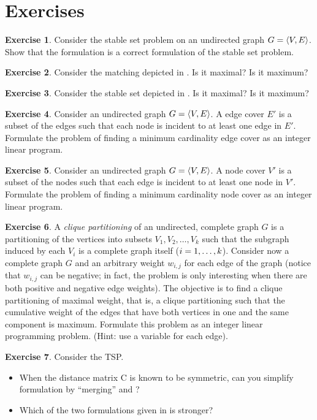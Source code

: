 \documentclass[titlepage]{book}
\makeatletter
\newcommand{\concept}[1]{\toindex{#1}\indexlayout{#1}}
\newcommand{\indexlayout}[1]{\emph{#1}}
\newcommand\toindex{\@ifstar{\@dblarg{\@toindexs}}{\@toindex}}
\def\@toindexs[#1]#2{\index{#1@#2}}
\newcommand\@toindex[2][]{%
  \if\relax\detokenize{#1}\relax
    \begingroup
    \@splitword#2\@nil%
    \uppercase\expandafter{%
      \expandafter\def\expandafter\@initial\expandafter{\@first}}%
    \toks0=\expandafter{\@initial}%
    \toks2=\expandafter{\@rest}%
    \edef\x{\endgroup\noexpand\index{\the\toks0 \the\toks2 }}\x
  \else
    \index{#1}
  \fi
}
\def\@splitword#1#2\@nil{\def\@first{#1}\def\@rest{#2}}
\theoremstyle{plain}
\theoremstyle{definition}
\newtheorem{exercise}{Exercise}[chapter]
\theoremstyle{remark}
\makeatother
\begin{document}
\section*{Exercises}
\begin{exercise}
Consider the stable set problem on an undirected graph $G=\tupl{V,E}$. Show that the formulation  is a correct formulation of the stable set problem.
\end{exercise}
\begin{exercise}
Consider the matching depicted in . Is it maximal? Is it maximum?
\end{exercise}
\begin{exercise}
Consider the stable set depicted in . Is it maximal? Is it maximum?
\end{exercise}
\begin{exercise}
Consider an undirected graph $G=\tupl{V,E}$. A edge cover $E'$ is a subset of the edges such that each node is incident to at least one edge in $E'$. Formulate the problem of finding a minimum cardinality edge cover as an integer linear program.
\end{exercise}
\begin{exercise}
Consider an undirected graph $G=\tupl{V,E}$. A node cover $V'$ is a subset of the nodes such that each edge is incident to at least one node in $V'$. Formulate the problem of finding a minimum cardinality node cover as an integer linear program.
\end{exercise}
\begin{exercise}
A \concept{clique partitioning} of an undirected, complete graph $G$ is a partitioning of the vertices into subsets $V_1,V_2,\ldots,V_k$ such that the subgraph induced by each $V_i$ is a complete graph itself ($\rangei[i]{1}{k}$). Consider now a complete graph $G$ and an arbitrary weight $w_{i,j}$ for each edge of the graph (notice that $w_{i,j}$ can be negative; in fact, the problem is only interesting when there are both positive and negative edge weights). The objective is to find a clique partitioning of maximal weight, that is, a clique partitioning such that the cumulative weight of the edges that have both vertices in one and the same component is maximum. Formulate this problem as an integer linear programming problem. (Hint: use a variable for each edge).
\end{exercise}
\begin{exercise}
Consider the TSP.
\begin{itemize}
 \item When the distance matrix C is known to be symmetric, can you simplify formulation  by ``merging''  and ?
 \item Which of the two formulations given in  is stronger?
\end{itemize}
\end{exercise}
\end{document}
